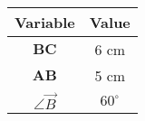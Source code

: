 \begin{center}
    \begin{tabular}{|c|c|} 
        \hline
            \textbf{Variable} & \textbf{Value} \\ 
        \hline
            $\boldsymbol{BC}$ & 6 cm \\ 
        \hline
            $\boldsymbol{AB}$ & 5 cm \\ 
        \hline
            $\angle \vec{B}$  & $60^\circ$ \\
        \hline
    \end{tabular}
\end{center}  


